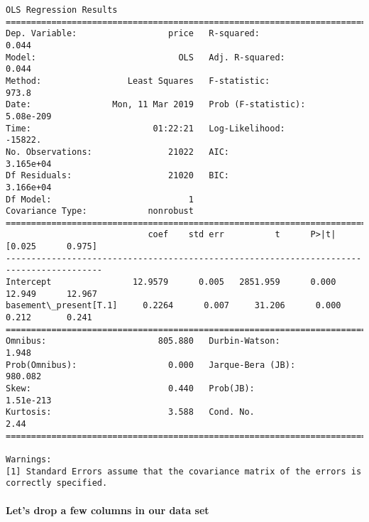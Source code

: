 \documentclass[11pt]{article}
\begin{document}
    \begin{Verbatim}[commandchars=\\\{\}]
                            OLS Regression Results                            
==============================================================================
Dep. Variable:                  price   R-squared:                       0.044
Model:                            OLS   Adj. R-squared:                  0.044
Method:                 Least Squares   F-statistic:                     973.8
Date:                Mon, 11 Mar 2019   Prob (F-statistic):          5.08e-209
Time:                        01:22:21   Log-Likelihood:                -15822.
No. Observations:               21022   AIC:                         3.165e+04
Df Residuals:                   21020   BIC:                         3.166e+04
Df Model:                           1                                         
Covariance Type:            nonrobust                                         
=========================================================================================
                            coef    std err          t      P>|t|      [0.025      0.975]
-----------------------------------------------------------------------------------------
Intercept                12.9579      0.005   2851.959      0.000      12.949      12.967
basement\_present[T.1]     0.2264      0.007     31.206      0.000       0.212       0.241
==============================================================================
Omnibus:                      805.880   Durbin-Watson:                   1.948
Prob(Omnibus):                  0.000   Jarque-Bera (JB):              980.082
Skew:                           0.440   Prob(JB):                    1.51e-213
Kurtosis:                       3.588   Cond. No.                         2.44
==============================================================================

Warnings:
[1] Standard Errors assume that the covariance matrix of the errors is correctly specified.

    \end{Verbatim}

    \paragraph{Let's drop a few columns in our data
set}\label{lets-drop-a-few-columns-in-our-data-set}
\end{document}
